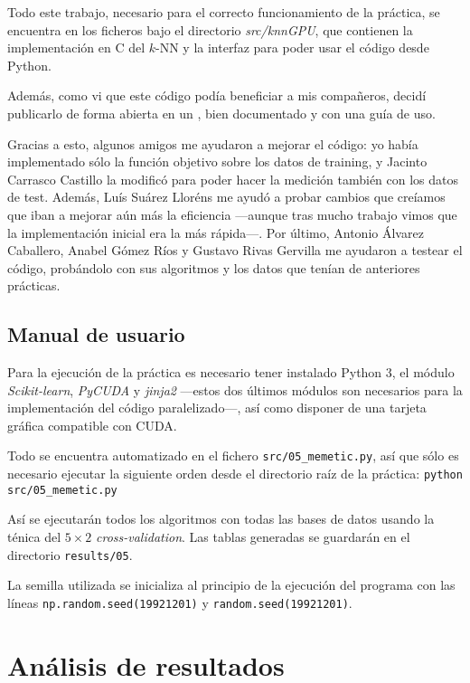 \documentclass[a4paper, 11pt, titlepage]{article}
\begin{document}
    Todo este trabajo, necesario para el correcto funcionamiento de la práctica, se encuentra en los ficheros bajo el directorio \emph{src/knnGPU}, que contienen la implementación en C del $k$-NN y la interfaz para poder usar el código desde Python.

    Además, como vi que este código podía beneficiar a mis compañeros, decidí publicarlo de forma abierta en un , bien documentado y con una guía de uso.

    Gracias a esto, algunos amigos me ayudaron a mejorar el código: yo había implementado sólo la función objetivo sobre los datos de training, y Jacinto Carrasco Castillo la modificó para poder hacer la medición también con los datos de test. Además, Luís Suárez Lloréns me ayudó a probar cambios que creíamos que iban a  mejorar aún más la eficiencia ---aunque tras mucho trabajo vimos que la implementación inicial era la más rápida---. Por último, Antonio Álvarez Caballero, Anabel Gómez Ríos y Gustavo Rivas Gervilla me ayudaron a testear el código, probándolo con sus algoritmos y los datos que tenían de anteriores prácticas.

    \subsection{Manual de usuario}
    Para la ejecución de la práctica es necesario tener instalado Python 3, el módulo \emph{Scikit-learn}, \emph{PyCUDA} y \emph{jinja2} ---estos dos últimos módulos son necesarios para la implementación del código paralelizado---, así como disponer de una tarjeta gráfica compatible con CUDA.

    Todo se encuentra automatizado en el fichero \texttt{src/05\_memetic.py}, así que sólo es necesario ejecutar la siguiente orden desde el directorio raíz de la práctica: \texttt{python src/05\_memetic.py}

    Así se ejecutarán todos los algoritmos con todas las bases de datos usando la ténica del  $5\times2$ \emph{cross-validation}. Las tablas generadas se guardarán en el directorio \texttt{results/05}.

    La semilla utilizada se inicializa al principio de la ejecución del programa con las líneas \texttt{np.random.seed(19921201)} y \texttt{random.seed(19921201)}.


    \section{Análisis de resultados}
\end{document}

